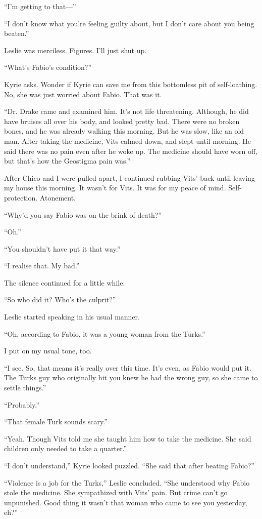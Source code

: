 \documentclass[oneside]{book}
\begin{document}
“I’m getting to that—”

“I don’t know what you’re feeling guilty about, but I don’t care about you being beaten.”

Leslie was merciless. Figures. I’ll just shut up.

“What’s Fabio’s condition?”

Kyrie asks. Wonder if Kyrie can save me from this bottomless pit of self-loathing. No, she was just worried about Fabio. That was it.

“Dr. Drake came and examined him. It’s not life threatening. Although, he did have bruises all over his body, and looked pretty bad. There were no broken bones, and he was already walking this morning. But he was slow, like an old man. After taking the medicine, Vits calmed down, and slept until morning. He said there was no pain even after he woke up. The medicine should have worn off, but that’s how the Geostigma pain was.”

After Chico and I were pulled apart, I continued rubbing Vits’ back until leaving my house this morning. It wasn’t for Vits. It was for my peace of mind. Self-protection. Atonement.

“Why’d you say Fabio was on the brink of death?”

“Oh.”

“You shouldn’t have put it that way.”

“I realise that. My bad.”

The silence continued for a little while.

“So who did it? Who’s the culprit?”

Leslie started speaking in his usual manner.

“Oh, according to Fabio, it was a young woman from the Turks.”

I put on my usual tone, too.

“I see. So, that means it’s really over this time. It’s even, as Fabio would put it. The Turks guy who originally hit you knew he had the wrong guy, so she came to settle things.”

“Probably.”

“That female Turk sounds scary.”

“Yeah. Though Vits told me she taught him how to take the medicine. She said children only needed to take a quarter.”

“I don’t understand,” Kyrie looked puzzled. “She said that after beating Fabio?”

“Violence is a job for the Turks,” Leslie concluded. “She understood why Fabio stole the medicine. She sympathized with Vits’ pain. But crime can’t go unpunished. Good thing it wasn’t that woman who came to see you yesterday, eh?”
\end{document}
